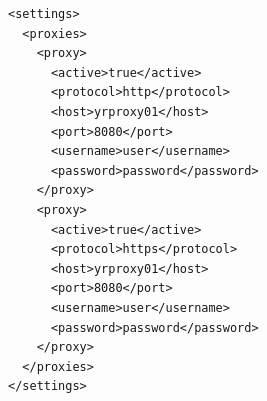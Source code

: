 \documentclass[small,algo]{dushClass}
\begin{document}
\begin{lstlisting}
<settings>
  <proxies>  
    <proxy>
      <active>true</active>
      <protocol>http</protocol>
      <host>yrproxy01</host>
      <port>8080</port>
      <username>user</username>
      <password>password</password>
    </proxy>
    <proxy>
      <active>true</active>
      <protocol>https</protocol>
      <host>yrproxy01</host>
      <port>8080</port>
      <username>user</username>
      <password>password</password>
    </proxy>    
  </proxies>  
</settings>

\end{lstlisting}
\end{document}
